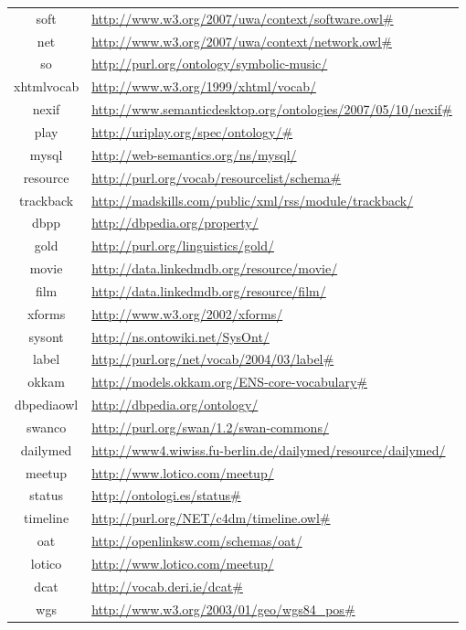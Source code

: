 \documentclass{article}
\begin{document}
\begin{longtable}{ c | p{8cm} }
soft & \url{http://www.w3.org/2007/uwa/context/software.owl#} \\
net & \url{http://www.w3.org/2007/uwa/context/network.owl#} \\
so & \url{http://purl.org/ontology/symbolic-music/} \\
xhtmlvocab & \url{http://www.w3.org/1999/xhtml/vocab/} \\
nexif & \url{http://www.semanticdesktop.org/ontologies/2007/05/10/nexif#} \\
play & \url{http://uriplay.org/spec/ontology/#} \\
mysql & \url{http://web-semantics.org/ns/mysql/} \\
resource & \url{http://purl.org/vocab/resourcelist/schema#} \\
trackback & \url{http://madskills.com/public/xml/rss/module/trackback/} \\
dbpp & \url{http://dbpedia.org/property/} \\
gold & \url{http://purl.org/linguistics/gold/} \\
movie & \url{http://data.linkedmdb.org/resource/movie/} \\
film & \url{http://data.linkedmdb.org/resource/film/} \\
xforms & \url{http://www.w3.org/2002/xforms/} \\
sysont & \url{http://ns.ontowiki.net/SysOnt/} \\
label & \url{http://purl.org/net/vocab/2004/03/label#} \\
okkam & \url{http://models.okkam.org/ENS-core-vocabulary#} \\
dbpediaowl & \url{http://dbpedia.org/ontology/} \\
swanco & \url{http://purl.org/swan/1.2/swan-commons/} \\
dailymed & \url{http://www4.wiwiss.fu-berlin.de/dailymed/resource/dailymed/} \\
meetup & \url{http://www.lotico.com/meetup/} \\
status & \url{http://ontologi.es/status#} \\
timeline & \url{http://purl.org/NET/c4dm/timeline.owl#} \\
oat & \url{http://openlinksw.com/schemas/oat/} \\
lotico & \url{http://www.lotico.com/meetup/} \\
dcat & \url{http://vocab.deri.ie/dcat#} \\
wgs & \url{http://www.w3.org/2003/01/geo/wgs84_pos#} \\

\end{longtable}
\end{document}
